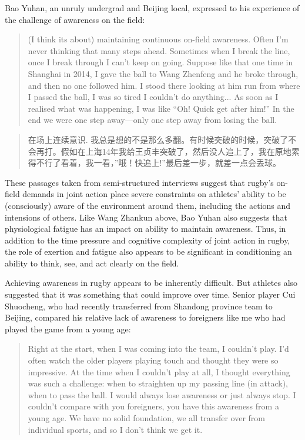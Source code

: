 \begin{CJK}{UTF8}{gbsn}
Bao Yuhan, an unruly undergrad and Beijing local, expressed to his experience of the challenge of awareness on the field:

  \begin{quote}
    (I think its about) maintaining continuous on-field awareness.  Often I'm never thinking that many steps ahead.  Sometimes when I break the line, once I break through I can't keep on going.  Suppose like that one time in Shanghai in 2014, I gave the ball to Wang Zhenfeng and he broke through, and then no one followed him.  I stood there looking at him run from where I passed the ball, I was so tired I couldn't do anything... As soon as I realised what was happening, I was like ``Oh! Quick get after him!'' In the end we were one step away---only one step away from losing the ball.
  \end{quote}

  \begin{quote}
    在场上连续意识. 我总是想的不是那么多翻。有时候突破的时候，突破了不会再打。假如在上海14年我给王贞丰突破了，然后没人追上了，我在原地累得不行了看着，我一看，''哦！快追上!''最后差一步，就差一点会丢球。
  \end{quote}

These passages taken from semi-structured interviews suggest that rugby's on-field demands in joint action place severe constraints on athletes' ability to be (consciously) aware of the environment around them, including the actions and intensions of others.  Like Wang Zhankun above, Bao Yuhan also suggests that physiological fatigue has an impact on ability to maintain awareness.  Thus, in addition to the time pressure and cognitive complexity of joint action in rugby, the role of exertion and fatigue also appears to be significant in conditioning an ability to think, see, and act clearly on the field.

Achieving awareness in rugby appears to be inherently difficult.  But athletes also suggested that it was something that could improve over time.  Senior player Cui Shuocheng, who had recently transferred from Shandong province team to Beijing, compared his relative lack of awareness to foreigners like me who had played the game from a young age:

    \begin{quote}
      Right at the start, when I was coming into the team, I couldn't play. I'd often watch the older players playing touch and thought they were so impressive.  At the time when I couldn't play at all, I thought everything was such a challenge: when to straighten up my passing line (in attack), when to pass the ball.  I would always lose awareness or just always stop. I couldn't compare with you foreigners, you have this awareness from a young age.  We have no solid foundation, we all transfer over from individual sports, and so I don't think we get it.
    \end{quote}


\end{CJK}
